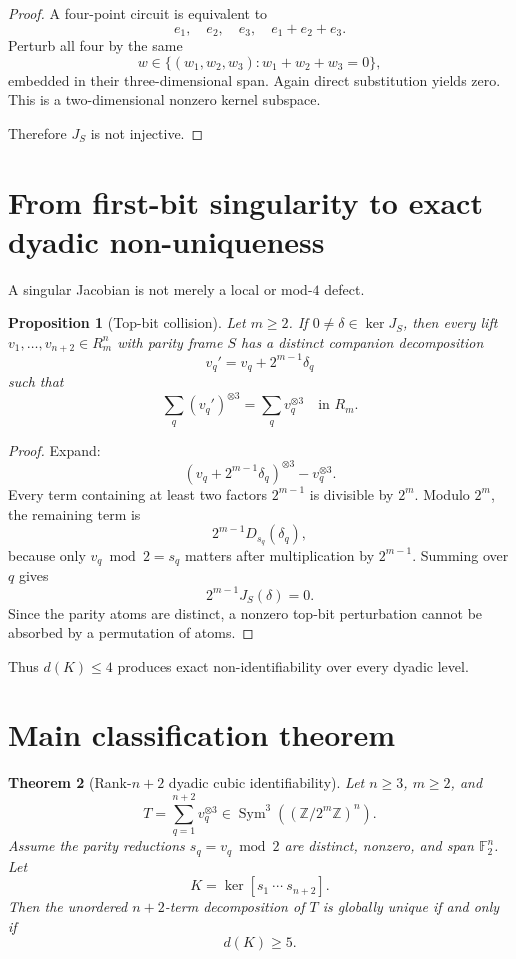 \documentclass[11pt]{article}
\newtheorem{theorem}{Theorem}
\newtheorem{proposition}[theorem]{Proposition}
\theoremstyle{definition}
\newcommand{\F}{\mathbb F}
\newcommand{\Z}{\mathbb Z}
\newcommand{\Sym}{\operatorname{Sym}}
\begin{document}
\begin{proof}
A four-point circuit is equivalent to
\[
e_1,\quad e_2,\quad e_3,\quad e_1+e_2+e_3.
\]
Perturb all four by the same
\[
w\in
\{(w_1,w_2,w_3):w_1+w_2+w_3=0\},
\]
embedded in their three-dimensional span. Again direct substitution yields zero. This is a two-dimensional nonzero kernel subspace.

Therefore \(J_S\) is not injective.
\end{proof}

\section{From first-bit singularity to exact dyadic non-uniqueness}
A singular Jacobian is not merely a local or mod-\(4\) defect.

\begin{proposition}[Top-bit collision]\label{prop:topbit}
Let \(m\ge2\). If \(0\ne\delta\in\ker J_S\), then every lift \(v_1,\ldots,v_{n+2}\in R_m^n\) with parity frame \(S\) has a distinct companion decomposition
\[
v_q'=v_q+2^{m-1}\delta_q
\]
such that
\[
\sum_q(v_q')^{\otimes3}
=
\sum_qv_q^{\otimes3}
\quad\text{in }R_m.
\]
\end{proposition}

\begin{proof}
Expand:
\[
(v_q+2^{m-1}\delta_q)^{\otimes3}-v_q^{\otimes3}.
\]
Every term containing at least two factors \(2^{m-1}\) is divisible by \(2^m\). Modulo \(2^m\), the remaining term is
\[
2^{m-1}D_{s_q}(\delta_q),
\]
because only \(v_q\bmod2=s_q\) matters after multiplication by \(2^{m-1}\). Summing over \(q\) gives
\[
2^{m-1}J_S(\delta)=0.
\]
Since the parity atoms are distinct, a nonzero top-bit perturbation cannot be absorbed by a permutation of atoms.
\end{proof}

Thus \(d(K)\le4\) produces exact non-identifiability over every dyadic level.

\section{Main classification theorem}
\begin{theorem}[Rank-\(n+2\) dyadic cubic identifiability]\label{thm:main}
Let \(n\ge3\), \(m\ge2\), and
\[
T=\sum_{q=1}^{n+2}v_q^{\otimes3}
\in\Sym^3((\Z/2^m\Z)^n).
\]
Assume the parity reductions \(s_q=v_q\bmod2\) are distinct, nonzero, and span \(\F_2^n\). Let
\[
K=\ker[s_1\ \cdots\ s_{n+2}].
\]
Then the unordered \(n+2\)-term decomposition of \(T\) is globally unique if and only if
\[
\boxed{d(K)\ge5.}
\]
\end{theorem}
\end{document}
